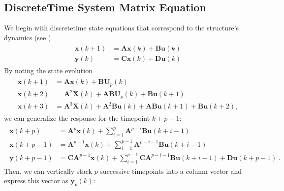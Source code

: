 \documentclass[letterpaper,10pt,english]{sphinxmanual}
\begin{document}
\subsection{Discrete\sphinxhyphen{}Time System Matrix Equation}
\label{\detokenize{theory/srim:discrete-time-system-matrix-equation}}
\sphinxAtStartPar
We begin with discrete\sphinxhyphen{}time state equations that correspond to the
structure’s dynamics (see ).
\begin{equation*}
\begin{split}\begin{aligned}
\bm{x}(k+1) &= \bm{Ax}(k) + \bm{Bu}(k) \\
\bm{y}(k) &= \bm{Cx}(k) + \bm{Du}(k)
\end{aligned}\end{split}
\end{equation*}
\sphinxAtStartPar
By noting the state evolution
\begin{equation*}
\begin{split}\begin{aligned}
\bm{x}(k+1) &= \bm{Ax}(k)+\bm{B}\bm{U}_{p}(k)\\
\bm{x}(k+2) &= \bm{A}^2\bm{X}(k) + \bm{AB}\bm{U}_{p}(k) + \bm{Bu}(k+1)\\
\bm{x}(k+3) &= \bm{A}^{3}\bm{X}(k) + \bm{A}^{2}\bm{Bu}(k) + \bm{ABu}(k+1) + \bm{Bu}(k+2),
\end{aligned}\end{split}
\end{equation*}
\sphinxAtStartPar
we can generalize the response for the timepoint \(k+p-1\):
\begin{equation*}
\begin{split}\begin{aligned}
\bm{x}(k+p) &= \bm{A}^{p}\bm{x}(k) + \sum_{i=1}^{p}\bm{A}^{p-i}\bm{Bu}(k+i-1)
\\
\bm{x}(k+p-1) &= \bm{A}^{p-1}\bm{x}(k) + \sum_{i=1}^{p-1}\bm{A}^{p-i-1}\bm{Bu}(k+i-1)
\\
\bm{y}(k+p-1) &= \bm{CA}^{p-1}\bm{x}(k) + \sum_{i=1}^{p-1}\bm{CA}^{p-i-1}\bm{Bu}(k+i-1)+\bm{Du}(k+p-1)~.
\end{aligned}\end{split}
\end{equation*}
\sphinxAtStartPar
Then, we can vertically stack \(p\) successive time\sphinxhyphen{}points into a
column vector and express this vector as \(\bm{y}_{p}(k)\):
\end{document}
